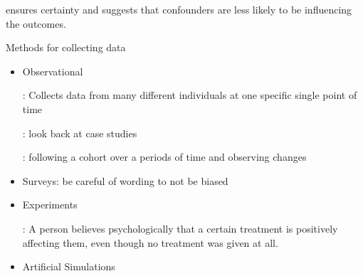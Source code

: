 \documentclass[12pt]{scrartcl}
\begin{document}
\begin{definition}
   ensures certainty and suggests that confounders are less likely
  to be influencing the outcomes.
\end{definition}

Methods for collecting data
\begin{itemize}
  \item Observational

  \begin{definition}
  : Collects data from many different individuals 
  at one specific single point of time
\end{definition}

\begin{definition}
  : look back at case studies
\end{definition}

\begin{definition}
  : following a cohort over a periods of time and observing changes
\end{definition}

  \item Surveys: be careful of wording to not be biased
  \item Experiments
  
\begin{definition}
  : A person believes psychologically that a certain 
  treatment is positively affecting them, even though no treatment was given at all.
\end{definition}

  \item Artificial Simulations
\end{itemize}
\end{document}
